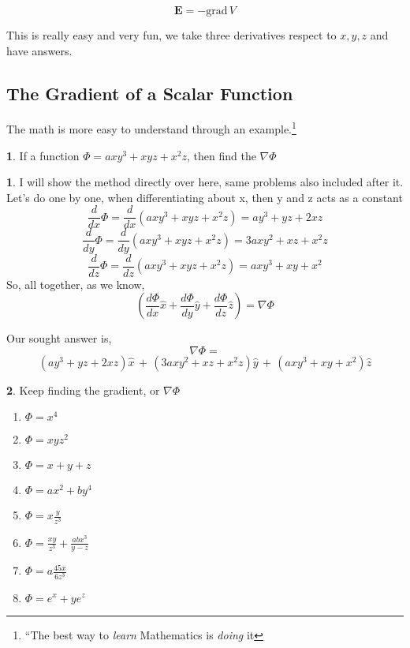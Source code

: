 \documentclass[11pt,a4paper,twocolumn,openright]{article}
\renewcommand{\vec}[1]{\boldsymbol{#1}}
\theoremstyle{definition}
\theoremstyle{definition}
\newtheorem{pr}{ \framebox[0.05\textwidth]{{\sffamily Pr}} }
\theoremstyle{definition}
\theoremstyle{definition}
\newtheorem{sol}{ \framebox[0.05\textwidth]{Sol} }
\begin{document}
\[ \vec{E} = - \mathrm{grad} \, V \]
 
 This is really easy and very fun, we take three derivatives respect to $x,y,z$ and have answers.
\subsection{\small{The Gradient of a Scalar Function}}

The math is more easy to understand through an example.\footnote{``The best way to \emph{learn} Mathematics is \emph{doing} it}

\begin{pr}
If a function $\Phi = axy ^3 + xyz + x^2z$, then find the $ \nabla \Phi $
\end{pr}

\begin{sol}
I will show the method directly over here, same problems also included after it.
\\
Let's do one by one, when differentiating about x, then y and z acts as a constant
\[ \frac{d}{dx} \Phi = \frac{d}{dx} (axy ^3 + xyz + x^2z) = 
	ay^3 + yz + 2xz \]
	\[ \frac{d}{dy} \Phi = \frac{d}{dy} (axy ^3 + xyz + x^2z) =
	3axy^2 + xz + x^2z \]
	\[ \frac{d}{dz} \Phi = \frac{d}{dz} (axy ^3 + xyz + x^2z) =
	axy^3 + xy + x^2 \]
So, all together, as we know,
 \[ \left(	\frac{d \Phi}{dx} \hat{x} + \frac{d \Phi}{dy} \hat{y} + \frac{d \Phi}{dz} \hat{z} \right)  = \nabla \Phi \]	

Our sought answer is,
\[\nabla\Phi = \]
\[ (ay^3 + yz + 2xz) \hat{x} \, + \, (3axy^2 + xz + x^2z) \hat{y} \, + \, (axy^3 + xy + x^2) \hat{z} \]


\end{sol}

\begin{pr}
Keep finding the gradient, or $ \nabla \Phi $ 
\begin{enumerate}
\item $\Phi= x^4 $
\item $\Phi= x y z^2 $
\item $\Phi= x + y +z $
\item $\Phi= ax^2 + by^4$
\item $\Phi= x\frac{y}{z^3}$
\item $\Phi= \frac{xy}{z^3} + \frac{abx^3}{y - z} $
\item $\Phi= a\frac{45x}{6z^3} $
\item $\Phi= e^x + ye^z $
\end{enumerate}
\end{pr}
\end{document}
